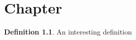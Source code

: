 \documentclass[baselinegrid,noprint,nocopyright]{uit-thesis-test}
\theoremstyle{definition}
\newtheorem{definition}{Definition}
\begin{document}
\mainmatter

\chapter{Chapter}
\lipsum[1][1-4]

\begin{definition}
  An interesting definition
\end{definition}

\lipsum[2][1-4]
\end{document}
